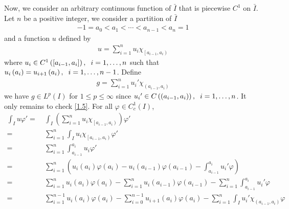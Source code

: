 \documentclass[a4paper,oneside]{book}
\numberwithin{equation}{chapter}
\begin{document}
\begin{enumerate}
Now, we consider an arbitrary continuous function of $\bar{I}$ that is piecewise $C^1$ on $\bar{I}$. Let $n$ be a positive integer, we consider a partition of $\bar{I}$ 
\begin{align}
- 1 = {a_0} < {a_1} <  \cdots  < {a_{n - 1}} < {a_n} = 1
\end{align}
and a function $u$ defined by
\begin{align}
u = \sum\limits_{i = 1}^n {{u_i}{\chi _{\left[ {{a_{i - 1}},{a_i}} \right)}}} 
\end{align}
where ${u_i} \in {C^1}\left( {\left[ {{a_{i - 1}},{a_i}} \right]} \right),\hspace{0.2cm} i = 1, \ldots ,n$ such that ${u_i}\left( {{a_i}} \right) = {u_{i + 1}}\left( {{a_i}} \right),\hspace{0.2cm}i = 1, \ldots ,n - 1$. Define 
\begin{align}
g = \sum\limits_{i = 1}^n {{u_i}'{\chi _{\left( {{a_{i - 1}},{a_i}} \right)}}} 
\end{align}
we have $g \in {L^p}\left( I \right)$ for $1\le p\le \infty$ since ${u_i}' \in C\left( {\left( {{a_{i - 1}},{a_i}} \right)} \right),\hspace{0.2cm} i = 1, \ldots ,n$. It only remains to check \eqref{1.5}. For all $\varphi \in C_c^1\left(I\right)$,
\begin{align}
\int_I {u\varphi '}  =&\ \int_I {\left( {\sum\limits_{i = 1}^n {{u_i}{\chi _{\left[ {{a_{i - 1}},{a_i}} \right)}}} } \right)\varphi '} \\
 =&\ \sum\limits_{i = 1}^n {\int_I {{u_i}{\chi _{\left[ {{a_{i - 1}},{a_i}} \right)}}\varphi '} } \\
 =&\ \sum\limits_{i = 1}^n {\int_{{a_{i - 1}}}^{{a_i}} {{u_i}\varphi '} } \\
 =&\ \sum\limits_{i = 1}^n {\left( {{u_i}\left( {{a_i}} \right)\varphi \left( {{a_i}} \right) - {u_i}\left( {{a_{i - 1}}} \right)\varphi \left( {{a_{i - 1}}} \right) - \int_{{a_{i - 1}}}^{{a_i}} {{u_i}'\varphi } } \right)} \\
 =&\ \sum\limits_{i = 1}^n {{u_i}\left( {{a_i}} \right)\varphi \left( {{a_i}} \right)}  - \sum\limits_{i = 1}^n {{u_i}\left( {{a_{i - 1}}} \right)\varphi \left( {{a_{i - 1}}} \right)}  - \sum\limits_{i = 1}^n {\int_{{a_{i - 1}}}^{{a_i}} {{u_i}'\varphi } } \\
 =&\ \sum\limits_{i = 1}^{n - 1} {{u_i}\left( {{a_i}} \right)\varphi \left( {{a_i}} \right)}  - \sum\limits_{i = 0}^{n - 1} {{u_{i + 1}}\left( {{a_i}} \right)\varphi \left( {{a_i}} \right)}  - \sum\limits_{i = 1}^n {\int_I {{u_i}'{\chi _{\left( {{a_{i - 1}},{a_i}} \right)}}\varphi } } \\

\end{align}
\end{enumerate}
\end{document}
